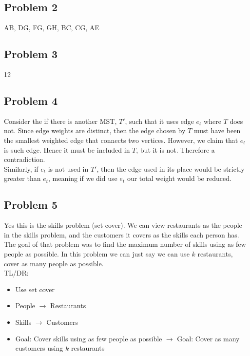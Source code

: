 \documentclass{article}
\begin{document}
\subsection*{Problem 2}
AB, DG, FG, GH, BC, CG, AE

\subsection*{Problem 3}
12

\subsection*{Problem 4}
Consider the if there is another MST, $T'$, such that it uses edge $e_t$ where $T$ does not. Since edge weights are distinct, then the edge chosen by $T$ must have been the smallest weighted edge that connects two vertices. However, we claim that $e_t$ is such edge. Hence it must be included in $T$, but it is not. Therefore a contradiction.\\

\noindent Similarly, if $e_t$ is not used in $T'$, then the edge used in its place would be strictly greater than $e_t$, meaning if we did use $e_t$ our total weight would be reduced. 

\subsection*{Problem 5}
Yes this is the skills problem (set cover). We can view restaurants as the people in the skills problem, and the customers it covers as the skills each person has. The goal of that problem was to find the maximum number of skills using as few people as possible. In this problem we can just say we can use $k$ restaurants, cover as many people as possible.\\

\noindent TL/DR:
\begin{itemize}
    \item Use set cover
    \item People $\rightarrow$ Restaurants
    \item Skills $\rightarrow$ Customers
    \item Goal: Cover skills using as few people as possible $\rightarrow$ Goal: Cover as many customers using $k$ restaurants
\end{itemize}
\end{document}
